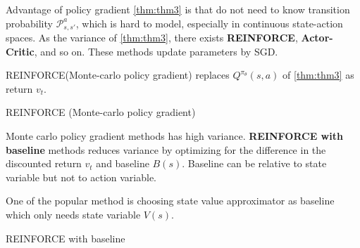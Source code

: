 \documentclass[
	10pt, %
]{article}
\theoremstyle{plain}
\def\n{\newline}
\newcommand{\mc}[1]{\mathcal{#1}}
\newcommand{\tb}[1]{\textbf{#1}}
\numberwithin{equation}{subsection} %
\begin{document}
Advantage of policy gradient \cref{thm:thm3} is that do not need to know transition probability $\mc{P}^a_{s, s'}$, which is hard to model, especially in continuous state-action spaces.
As the variance of \cref{thm:thm3}, there exists \tb{REINFORCE}, \tb{Actor-Critic}, and so on. These methods update parameters by SGD.

REINFORCE(Monte-carlo policy gradient) replaces $Q^{\pi_\theta}(s,a)$ of \cref{thm:thm3} as return $v_t$.
\begin{algorithm}
    \Output{$\theta$}
\caption{REINFORCE (Monte-carlo policy gradient)}
\end{algorithm}


Monte carlo policy gradient methods has high variance. \tb{REINFORCE with baseline} methods reduces variance by optimizing for the difference in the discounted return $v_t$ and baseline $B(s)$.
Baseline can be relative to state variable but not to action variable.

One of the popular method is choosing state value approximator as baseline which only needs state variable $V(s)$.

\begin{algorithm}
    \Init{
        $\theta$, arbitrary\n
        w, arbitrary\n
    }
\caption{REINFORCE with baseline} \label{alg:alg11}
\end{algorithm}
\end{document}
